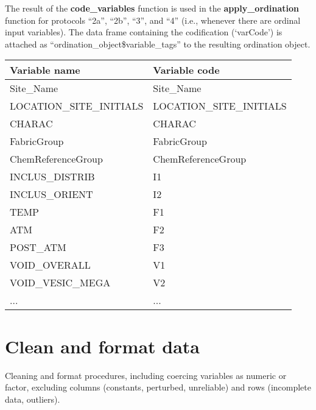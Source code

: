 \documentclass[12pt,]{book}
\begin{document}
The result of the \textbf{code\_variables} function is used in the \textbf{apply\_ordination} function for protocols ``2a'', ``2b'', ``3'', and ``4'' (i.e., whenever there are ordinal input variables). The data frame containing the codification (`varCode') is attached as ``ordination\_object\$variable\_tags'' to the resulting ordination object.

\begin{tabular}{l|l}
\hline
Variable name & Variable code\\
\hline
Site\_Name & Site\_Name\\
\hline
LOCATION\_SITE\_INITIALS & LOCATION\_SITE\_INITIALS\\
\hline
CHARAC & CHARAC\\
\hline
FabricGroup & FabricGroup\\
\hline
ChemReferenceGroup & ChemReferenceGroup\\
\hline
INCLUS\_DISTRIB & I1\\
\hline
INCLUS\_ORIENT & I2\\
\hline
TEMP & F1\\
\hline
ATM & F2\\
\hline
POST\_ATM & F3\\
\hline
VOID\_OVERALL & V1\\
\hline
VOID\_VESIC\_MEGA & V2\\
\hline
... & ...\\
\hline
\end{tabular}

\hypertarget{clean-and-format-data}{%
\section{Clean and format data}\label{clean-and-format-data}}

Cleaning and format procedures, including coercing variables as numeric or factor, excluding columns (constants, perturbed, unreliable) and rows (incomplete data, outliers).
\end{document}
